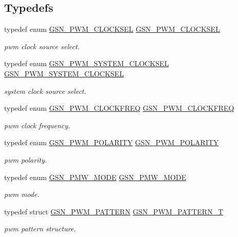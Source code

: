 \subsection*{Typedefs}
\begin{DoxyCompactItemize}
\item 
typedef enum \hyperlink{a00650_gafda5110eb592af71b799ed22c7ebf902}{GSN\_\-PWM\_\-CLOCKSEL} \hyperlink{a00650_ga6c0d8b08ff5dfcf29b094374033312e9}{GSN\_\-PWM\_\-CLOCKSEL}
\begin{DoxyCompactList}\small\item\em pwm clock source select. \end{DoxyCompactList}\item 
typedef enum \hyperlink{a00650_ga110e33b4ac34f5c1b7e1f1e3b27d2281}{GSN\_\-PWM\_\-SYSTEM\_\-CLOCKSEL} \hyperlink{a00650_ga5b3a1c776cee49d77ba7c367502eeb53}{GSN\_\-PWM\_\-SYSTEM\_\-CLOCKSEL}
\begin{DoxyCompactList}\small\item\em system clock source select. \end{DoxyCompactList}\item 
typedef enum \hyperlink{a00650_ga52371d0feb719879e34584cfa2ef6733}{GSN\_\-PWM\_\-CLOCKFREQ} \hyperlink{a00650_ga66c6af105ee29581b24b10edad6bb0b9}{GSN\_\-PWM\_\-CLOCKFREQ}
\begin{DoxyCompactList}\small\item\em pwm clock frequency. \end{DoxyCompactList}\item 
typedef enum \hyperlink{a00650_gaea0350ae8992c56b4a1bad6bc7ad5de1}{GSN\_\-PWM\_\-POLARITY} \hyperlink{a00650_ga852441593095a912d86bc01bbe8678f0}{GSN\_\-PWM\_\-POLARITY}
\begin{DoxyCompactList}\small\item\em pwm polarity. \end{DoxyCompactList}\item 
typedef enum \hyperlink{a00650_ga2ce321cf068e815e8a30642d73f1bdd4}{GSN\_\-PMW\_\-MODE} \hyperlink{a00650_gae68dbc7fb3fb9bb56a6d4abcbbba43b2}{GSN\_\-PMW\_\-MODE}
\begin{DoxyCompactList}\small\item\em pwm mode. \end{DoxyCompactList}\item 
typedef struct \hyperlink{a00183}{GSN\_\-PWM\_\-PATTERN} \hyperlink{a00650_ga3a1ee0c27116f4c45c7d0369eb2723a3}{GSN\_\-PWM\_\-PATTERN\_\-T}
\begin{DoxyCompactList}\small\item\em pwm pattern structure. \end{DoxyCompactList}\item 

\end{DoxyCompactItemize}
